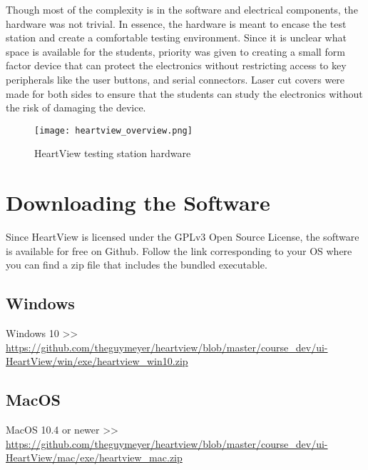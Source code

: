 \documentclass[11pt,fleqn]{book} %
\begin{document}
Though most of the complexity is in the software and electrical components, the hardware was not trivial. In essence, the hardware is meant to encase the test station and create a comfortable testing environment. Since it is unclear what space is available for the students, priority was given to creating a small form factor device that can protect the electronics without restricting access to key peripherals like the user buttons, and serial connectors. Laser cut covers were made for both sides to ensure that the students can study the electronics without the risk of damaging the device.

\begin{figure}[h]
	\centering\texttt{[image: heartview\_overview.png]}
	\caption{HeartView testing station hardware}
	\label{fig:heartview_overview} %
\end{figure}



\section{Downloading the Software}\label{sec:downloading_the_software}

Since HeartView is licensed under the GPLv3 Open Source License, the software is available for free on Github. Follow the link corresponding to your \ac{OS} where you can find a zip file that includes the bundled executable.

\subsection{Windows}

Windows 10 >>\\ \url{https://github.com/theguymeyer/heartview/blob/master/course_dev/ui-HeartView/win/exe/heartview_win10.zip}

\subsection{MacOS}

MacOS 10.4 or newer >>\\ \url{https://github.com/theguymeyer/heartview/blob/master/course_dev/ui-HeartView/mac/exe/heartview_mac.zip}
\end{document}
